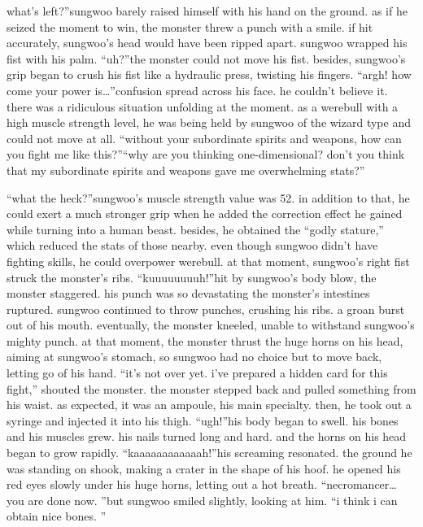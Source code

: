 what’s left?”sungwoo barely raised himself with his hand on the ground.
 as if he seized the moment to win, the monster threw a punch with a smile.
 if hit accurately, sungwoo’s head would have been ripped apart.
sungwoo wrapped his fist with his palm.
“uh?”the monster could not move his fist.
 besides, sungwoo’s grip began to crush his fist like a hydraulic press, twisting his fingers.
“argh! how come your power is…”confusion spread across his face.
 he couldn’t believe it.
 there was a ridiculous situation unfolding at the moment.
 as a werebull with a high muscle strength level, he was being held by sungwoo of the wizard type and could not move at all.
“without your subordinate spirits and weapons, how can you fight me like this?”“why are you thinking one-dimensional? don’t you think that my subordinate spirits and weapons gave me overwhelming stats?”

“what the heck?”sungwoo’s muscle strength value was 52.
 in addition to that, he could exert a much stronger grip when he added the correction effect he gained while turning into a human beast.
 besides, he obtained the “godly stature,” which reduced the stats of those nearby.
even though sungwoo didn’t have fighting skills, he could overpower werebull.
at that moment, sungwoo’s right fist struck the monster’s ribs.
“kuuuuuuuuh!”hit by sungwoo’s body blow, the monster staggered.
 his punch was so devastating the monster’s intestines ruptured.
sungwoo continued to throw punches, crushing his ribs.
 a groan burst out of his mouth.
 eventually, the monster kneeled, unable to withstand sungwoo’s mighty punch.
at that moment, the monster thrust the huge horns on his head, aiming at sungwoo’s stomach, so sungwoo had no choice but to move back, letting go of his hand.
“it’s not over yet.
 i’ve prepared a hidden card for this fight,” shouted the monster.
the monster stepped back and pulled something from his waist.
as expected, it was an ampoule, his main specialty.
 then, he took out a syringe and injected it into his thigh.
“ugh!”his body began to swell.
 his bones and his muscles grew.
 his nails turned long and hard.
 and the horns on his head began to grow rapidly.
“kaaaaaaaaaaaah!”his screaming resonated.
 the ground he was standing on shook, making a crater in the shape of his hoof.
he opened his red eyes slowly under his huge horns, letting out a hot breath.
“necromancer… you are done now.
”but sungwoo smiled slightly, looking at him.
“i think i can obtain nice bones.
”

 